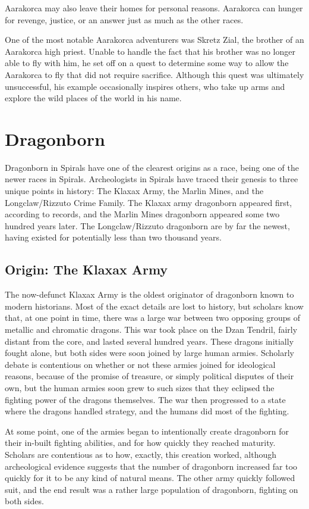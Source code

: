 \begin{multicols}{2}
Aarakorca may also leave their homes for personal reasons.
Aarakorca can hunger for revenge, justice, or an answer just as much as the other races.

One of the most notable Aarakorca adventurers was Skretz Zial, the brother of an Aarakorca high priest.
Unable to handle the fact that his brother was no longer able to fly with him, he set off on a quest to determine some way to allow the Aarakorca to fly that did not require sacrifice.
Although this quest was ultimately unsuccessful, his example occasionally inspires others, who take up arms and explore the wild places of the world in his name.

\section{Dragonborn}
Dragonborn in Spirals have one of the clearest origins as a race, being one of the newer races in Spirals.
Archeologists in Spirals have traced their genesis to three unique points in history: The Klaxax Army, the Marlin Mines, and the Longclaw/Rizzuto Crime Family.
The Klaxax army dragonborn appeared first, according to records, and the Marlin Mines dragonborn appeared some two hundred years later.
The Longclaw/Rizzuto dragonborn are by far the newest, having existed for potentially less than two thousand years.

\subsection{Origin: The Klaxax Army}
The now-defunct Klaxax Army is the oldest originator of dragonborn known to modern historians.
Most of the exact details are lost to history, but scholars know that, at one point in time, there was a large war between two opposing groups of metallic and chromatic dragons.
This war took place on the Dzan Tendril, fairly distant from the core, and lasted several hundred years.
These dragons initially fought alone, but both sides were soon joined by large human armies. 
Scholarly debate is contentious on whether or not these armies joined for ideological reasons, because of the promise of treasure, or simply political disputes of their own, but the human armies soon grew to such sizes that they eclipsed the fighting power of the dragons themselves.
The war then progressed to a state where the dragons handled strategy, and the humans did most of the fighting.

At some point, one of the armies began to intentionally create dragonborn for their in-built fighting abilities, and for how quickly they reached maturity.
Scholars are contentious as to how, exactly, this creation worked, although archeological evidence suggests that the number of dragonborn increased far too quickly for it to be any kind of natural means.
The other army quickly followed suit, and the end result was a rather large population of dragonborn, fighting on both sides.


\end{multicols}
